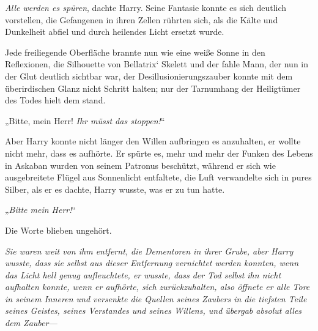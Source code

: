 \emph{Alle werden es spüren}, dachte Harry. Seine Fantasie konnte es sich deutlich vorstellen, die Gefangenen in ihren Zellen rührten sich, als die Kälte und Dunkelheit abfiel und durch heilendes Licht ersetzt wurde.

Jede freiliegende Oberfläche brannte nun wie eine weiße Sonne in den Reflexionen, die Silhouette von Bellatrix‘ Skelett und der fahle Mann, der nun in der Glut deutlich sichtbar war, der Desillusionierungszauber konnte mit dem überirdischen Glanz nicht Schritt halten; nur der Tarnumhang der Heiligtümer des Todes hielt dem stand.

„Bitte, mein Herr! \emph{Ihr müsst das stoppen!}“

Aber Harry konnte nicht länger den Willen aufbringen es anzuhalten, er wollte nicht mehr, dass es aufhörte. Er spürte es, mehr und mehr der Funken des Lebens in Askaban wurden von seinem Patronus beschützt, während er sich wie ausgebreitete Flügel aus Sonnenlicht entfaltete, die Luft verwandelte sich in pures Silber, als er es dachte, Harry wusste, was er zu tun hatte.

„\emph{Bitte mein Herr!}“

Die Worte blieben ungehört.

\emph{Sie waren weit von ihm entfernt, die Dementoren in ihrer Grube, aber Harry wusste, dass sie selbst aus dieser Entfernung vernichtet werden konnten, wenn das Licht hell genug aufleuchtete, er wusste, dass der Tod selbst ihn nicht aufhalten konnte, wenn er aufhörte, sich zurückzuhalten, also öffnete er alle Tore in seinem Inneren und versenkte die Quellen seines Zaubers in die tiefsten Teile seines Geistes, seines Verstandes und seines Willens, und übergab absolut alles dem Zauber—}

